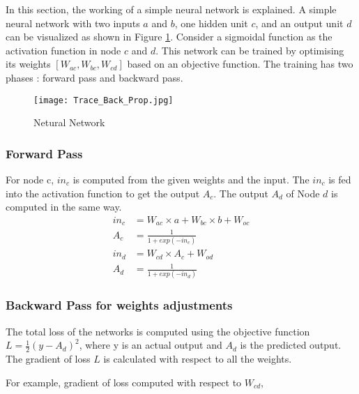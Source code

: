 \documentclass[12pt]{report} %
\begin{document}
In this section, the working of a simple neural network is explained. A simple neural network with two inputs $a$ and $b$, one hidden unit $c$, and an output unit $d$ can be visualized as shown in Figure \ref{net}. Consider a sigmoidal function as the activation function in node $c$ and $d$. This network can be trained by optimising its weights $[W_{ac}, W_{bc}, W_{cd}]$ based on an objective function. The training has two phases : forward pass and backward pass.

\begin{figure}[h]
	\centering
	\caption{Netural Network}
	\label{net}
	\texttt{[image: Trace\_Back\_Prop.jpg]}
\end{figure} 



\subsubsection*{Forward Pass}

For node c, $in_{c}$ is computed from the given weights and the input. The $in_{c}$ is fed into the activation function to get the output $A_{c}$. The output $A_{d}$ of Node $d$ is computed in the same way.
\begin{align} 
in_{c}	& = W_{ac} \times a + W_{bc} \times b + W_{oc} \\
A_{c} & = \frac{1}{1+exp(-in_{c})} \\
in_{d}	& = W_{cd} \times A_c + W_{od} \\
A_{d} & = \frac{1}{1+exp(-in_{d})} 
\end{align}

%

\subsubsection*{Backward Pass for weights adjustments}
The total loss of the networks is computed using the objective function $L = \frac{1}{2} (y - A_{d})^{2}$, where y is an actual output and $A_{d}$ is the predicted output. The gradient of loss $L$ is calculated with respect to all the weights.

For example, gradient of loss computed with respect to $W_{cd}$, 
\end{document}
